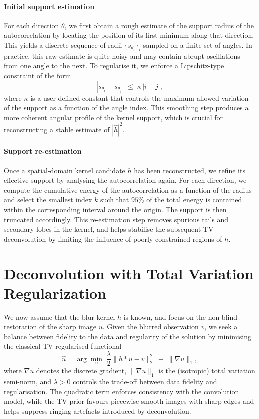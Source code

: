 \documentclass[a4paper,11pt]{article}
\begin{document}
\paragraph{Initial support estimation}
For each direction $\theta$, we first obtain a rough estimate of the support radius of the autocorrelation by locating the position of its first minimum along that direction. This yields a discrete sequence of radii $\{s_{\theta_i}\}_i$ sampled on a finite set of angles. In practice, this raw estimate is quite noisy and may contain abrupt oscillations from one angle to the next. To regularise it, we enforce a Lipschitz-type constraint of the form
\[
|s_{\theta_i} - s_{\theta_j}| \;\leq\; \kappa\,|i - j|,
\]
where $\kappa$ is a user-defined constant that controls the maximum allowed variation of the support as a function of the angle index. This smoothing step produces a more coherent angular profile of the kernel support, which is crucial for reconstructing a stable estimate of $|\hat h|^2$.

\paragraph{Support re-estimation}
Once a spatial-domain kernel candidate $h$ has been reconstructed, we refine its effective support by analysing the autocorrelation again. For each direction, we compute the cumulative energy of the autocorrelation as a function of the radius and select the smallest index $k$ such that $95\%$ of the total energy is contained within the corresponding interval around the origin. The support is then truncated accordingly. This re-estimation step removes spurious tails and secondary lobes in the kernel, and helps stabilise the subsequent TV-deconvolution by limiting the influence of poorly constrained regions of $h$.












\section{Deconvolution with Total Variation Regularization}

We now assume that the blur kernel $h$ is known, and focus on the non-blind
restoration of the sharp image $u$. Given the blurred observation $v$, we seek
a balance between fidelity to the data and regularity of the solution by
minimising the classical TV-regularised functional
\[
\hat{u}
=
\arg\min_{u}
\;\frac{\lambda}{2}\|h * u - v\|_2^2
\;+\;
\|\nabla u\|_1,
\]
where $\nabla u$ denotes the discrete gradient, $\|\nabla u\|_1$ is the
(isotropic) total variation semi-norm, and $\lambda>0$ controls the trade-off
between data fidelity and regularisation. The quadratic term enforces
consistency with the convolution model, while the TV prior favours
piecewise-smooth images with sharp edges and helps suppress ringing artefacts
introduced by deconvolution.
\end{document}
